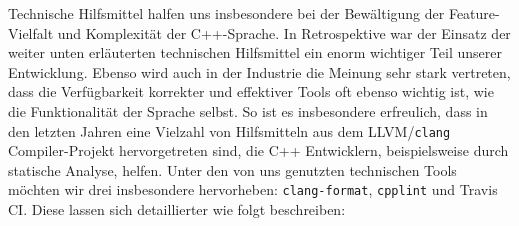Technische Hilfsmittel halfen uns insbesondere bei der Bewältigung der
Feature-Vielfalt und Komplexität der C++-Sprache. In Retrospektive war der
Einsatz der weiter unten erläuterten technischen Hilfsmittel ein enorm wichtiger
Teil unserer Entwicklung. Ebenso wird auch in der Industrie die Meinung sehr
stark vertreten, dass die Verfügbarkeit korrekter und effektiver Tools oft
ebenso wichtig ist, wie die Funktionalität der Sprache selbst. So ist es
insbesondere erfreulich, dass in den letzten Jahren eine Vielzahl von
Hilfsmitteln aus dem LLVM/\texttt{clang} Compiler-Projekt hervorgetreten sind,
die C++ Entwicklern, beispielsweise durch statische Analyse, helfen. Unter den
von uns genutzten technischen Tools möchten wir drei insbesondere hervorheben:
\texttt{clang-format}, \texttt{cpplint} und Travis CI. Diese lassen sich
detaillierter wie folgt beschreiben:
